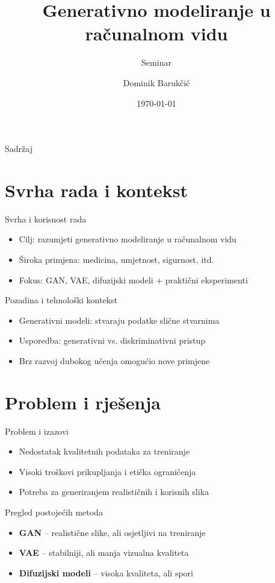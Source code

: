 \documentclass[aspectratio=169, xcolor=dvipsnames]{beamer}
\title{Generativno modeliranje u računalnom vidu}
\subtitle{Seminar}
\author{Dominik Barukčić}
\institute{
	Fakultet elektrotehnike i računarstva \\
	Sveučilište u Zagrebu
}
\date{\today}
\begin{document}
	
	\begin{frame}
		\titlepage
	\end{frame}
	
	\begin{frame}{Sadržaj}
		\tableofcontents
	\end{frame}
	
	\section{Svrha rada i kontekst}
	
	\begin{frame}{Svrha i korisnost rada}
		\begin{itemize}
			\item Cilj: razumjeti generativno modeliranje u računalnom vidu
			\item Široka primjena: medicina, umjetnost, sigurnost, itd.
			\item Fokus: GAN, VAE, difuzijski modeli + praktični eksperimenti
		\end{itemize}
	\end{frame}
	
	\begin{frame}{Pozadina i tehnološki kontekst}
		\begin{itemize}
			\item Generativni modeli: stvaraju podatke slične stvarnima
			\item Usporedba: generativni vs. diskriminativni pristup
			\item Brz razvoj dubokog učenja omogućio nove primjene
		\end{itemize}
	\end{frame}
	
	\section{Problem i rješenja}
	
	\begin{frame}{Problem i izazovi}
		\begin{itemize}
			\item Nedostatak kvalitetnih podataka za treniranje
			\item Visoki troškovi prikupljanja i etička ograničenja
			\item Potreba za generiranjem realističnih i korisnih slika
		\end{itemize}
	\end{frame}
	
	\begin{frame}{Pregled postojećih metoda}
		\begin{itemize}
			\item \textbf{GAN} – realistične slike, ali osjetljivi na treniranje
			\item \textbf{VAE} – stabilniji, ali manja vizualna kvaliteta
			\item \textbf{Difuzijski modeli} – visoka kvaliteta, ali spori
		\end{itemize}
	\end{frame}
	
\end{document}
